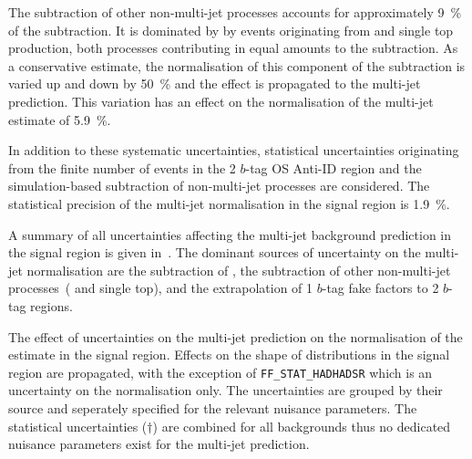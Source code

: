 The subtraction of other non-multi-jet processes accounts for
approximately \SI{9}{\percent} of the subtraction. It is dominated by
by events originating from \Vjets and single top production, both
processes contributing in equal amounts to the subtraction. As a
conservative estimate, the normalisation of this component of the
subtraction is varied up and down by \SI{50}{\percent} and the effect
is propagated to the multi-jet prediction. This variation has an
effect on the normalisation of the multi-jet estimate of
\SI{5.9}{\percent}.

In addition to these systematic uncertainties, statistical
uncertainties originating from the finite number of events in the 2
$b$-tag OS Anti-ID region and the simulation-based subtraction of
non-multi-jet processes are considered. The statistical precision of
the multi-jet normalisation in the signal region is
\SI{1.9}{\percent}.

A summary of all uncertainties affecting the multi-jet background
prediction in the signal region is given
in~. The dominant sources of
uncertainty on the multi-jet normalisation are the subtraction of
\ttbarFakes, the subtraction of other non-multi-jet processes~(\Vjets
and single top), and the extrapolation of 1 $b$-tag fake factors to 2
$b$-tag regions.

\begin{table}[htbp]
  \centering

  

  \caption{The effect of uncertainties on the multi-jet prediction on
    the normalisation of the estimate in the \hadhad signal
    region. Effects on the shape of distributions in the signal region
    are propagated, with the exception of \texttt{FF\_STAT\_HADHADSR}
    which is an uncertainty on the normalisation only. The
    uncertainties are grouped by their source and seperately specified
    for the relevant nuisance parameters. The statistical
    uncertainties ($\dagger$) are combined for all backgrounds thus no
    dedicated nuisance parameters exist for the multi-jet prediction.}
  \label{tab:multi_jet_uncertainties}
\end{table}





